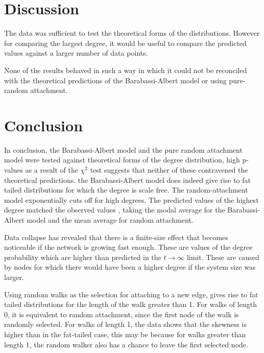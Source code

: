 \documentclass[twoside]{article}
\begin{document}

\section{Discussion}
The data was sufficient to test the theoretical forms of the distributions. However for comparing the largest degree, it would be useful to compare the predicted values against a larger number of data points. 

None of the results behaved in such a way in which it could not be reconciled with the theoretical predictions of the Barabassi-Albert model or using pure-random attachment.



\section{Conclusion}
In conclusion, the Barabassi-Albert model and the pure random attachment model were tested against theoretical forms of the degree distribution, high p-values as a result of the $\chi^2$ test suggests that neither of these contravened the theoretical predictions. the Barabassi-Albert model does indeed give rise to fat tailed distributions for which the degree is scale free. The random-attachment model exponentially cuts off for high degrees. The predicted values of the highest degree matched the observed values , taking the modal average for the Barabassi-Albert model and the mean average for random attachment. 

Data collapse has revealed that there is a finite-size effect that becomes noticeable if the network is growing fast enough. These are values of the degree probability which are higher than predicted in the $t \to \infty$ limit. These are caused by nodes for which there would have been a higher degree if the system size was larger.

Using random walks as the selection for attaching to a new edge, gives rise to fat tailed distributions for the length of the walk greater than 1. For walks of length 0, it is equivalent to random attachment, since the first node of the walk is randomly selected. For walks of length 1, the data shows that the skewness is higher than in the fat-tailed case, this may be because for walks greater than length 1, the random walker also has a chance to leave the first selected node.
\end{document}
